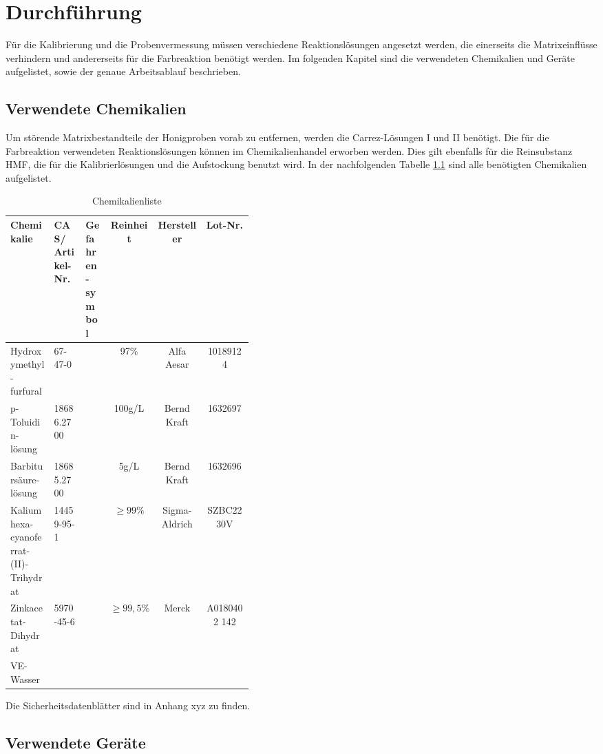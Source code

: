 \chapter{Durchführung}

Für die Kalibrierung und die Probenvermessung müssen verschiedene Reaktionslösungen angesetzt werden, die einerseits die Matrixeinflüsse verhindern und andererseits für die Farbreaktion benötigt werden. Im folgenden Kapitel sind die verwendeten Chemikalien und Geräte aufgelistet, sowie der genaue Arbeitsablauf beschrieben.

\section{Verwendete Chemikalien}


Um störende Matrixbestandteile der Honigproben vorab zu entfernen, werden die Carrez-Lösungen I und II benötigt. Die für die Farbreaktion verwendeten Reaktionslösungen können im Chemikalienhandel erworben werden. Dies gilt ebenfalls für die Reinsubstanz HMF, die für die Kalibrierlösungen und die Aufstockung benutzt wird. In der nachfolgenden Tabelle \ref{tab:Chemikalienliste} sind alle benötigten Chemikalien aufgelistet.

\begin{table}[htbp]
	\centering
		\begin{tabular}{p{0.18\linewidth}|p{0.13\linewidth}|p{0.1\linewidth}|c|c|c} 
			Chemikalie & CAS/ Artikel-Nr. & Gefahren-symbol & Reinheit & Hersteller & Lot-Nr.\\
			\hline
			Hydroxymethyl-furfural & 67-47-0 & & 97\% & Alfa Aesar & 10189124\\
			\hline
			p-Toluidin-lösung & 18686.2700 & & 100g/L & Bernd Kraft & 1632697\\
			\hline
			Barbitursäure-lösung & 18685.2700 & & 5g/L & Bernd Kraft & 1632696\\
			\hline
			Kaliumhexa-cyanoferrat-(II)-Trihydrat & 14459-95-1 & & $\geq99\%$ & Sigma-Aldrich & SZBC2230V\\
			\hline
			Zinkacetat-Dihydrat & 5970-45-6 & & $\geq99,5\%$ & Merck & A0180402 142\\
			\hline
			VE-Wasser & & & & &
		\end{tabular}
	\caption{Chemikalienliste}
	\label{tab:Chemikalienliste}
\end{table}
Die Sicherheitsdatenblätter sind in Anhang xyz zu finden.

\section{Verwendete Geräte}

